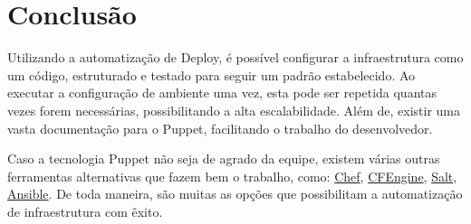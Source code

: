 \documentclass[12pt]{article}
\begin{document}
\section{Conclusão}
\label{sec:conclus_o}

Utilizando a automatização de Deploy, é possível configurar a infraestrutura como um código, estruturado e testado
para seguir um padrão estabelecido. Ao executar a configuração de ambiente uma vez, esta pode ser repetida quantas
vezes forem necessárias, possibilitando a alta escalabilidade. Além de, existir uma vasta documentação para o Puppet, 
facilitando o trabalho do desenvolvedor.

Caso a tecnologia Puppet não seja de agrado da equipe, existem várias outras ferramentas alternativas que fazem bem o
trabalho, como: \href{https://www.chef.io/chef/}{Chef}, \href{http://cfengine.com/}{CFEngine}, \href{http://saltstack.com/}{Salt},
\href{http://www.ansibleworks.com/}{Ansible}. De toda maneira, são muitas as opções que possibilitam a automatização
de infraestrutura com êxito.
\end{document}
